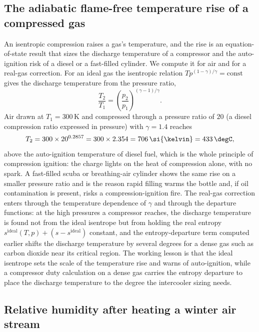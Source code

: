\subsection{The adiabatic flame-free temperature rise of a compressed gas}

An isentropic compression raises a gas's temperature, and the rise is an
equation-of-state result that sizes the discharge temperature of a compressor
and the auto-ignition risk of a diesel or a fast-filled cylinder. We compute
it for air and for a real-gas correction. For an ideal gas the isentropic
relation $Tp^{(1-\gamma)/\gamma} = \text{const}$ gives the discharge
temperature from the pressure ratio,
\[
\frac{T_2}{T_1} = \left(\frac{p_2}{p_1}\right)^{(\gamma - 1)/\gamma}.
\]
Air drawn at $T_1 = 300\,\si{\kelvin}$ and compressed through a pressure
ratio of $20$ (a diesel compression ratio expressed in pressure) with
$\gamma = 1.4$ reaches
\[
T_2 = 300\times 20^{0.2857} = 300\times 2.354 = 706\,\si{\kelvin} =
433\,\degC,
\]
above the auto-ignition temperature of diesel fuel, which is the whole
principle of compression ignition: the charge lights on the heat of
compression alone, with no spark. A fast-filled scuba or breathing-air
cylinder shows the same rise on a smaller pressure ratio and is the reason
rapid filling warms the bottle and, if oil contamination is present, risks a
compression-ignition fire. The real-gas correction enters through the
temperature dependence of $\gamma$ and through the departure functions: at
the high pressures a compressor reaches, the discharge temperature is found
not from the ideal isentrope but from holding the real entropy $s^{\text{ideal}}
(T,p) + (s - s^{\text{ideal}})$ constant, and the entropy-departure term
computed earlier shifts the discharge temperature by several degrees for a
dense gas such as carbon dioxide near its critical region. The working lesson
is that the ideal isentrope sets the scale of the temperature rise and warns
of auto-ignition, while a compressor duty calculation on a dense gas carries
the entropy departure to place the discharge temperature to the degree the
intercooler sizing needs.

\subsection{Relative humidity after heating a winter air stream}

